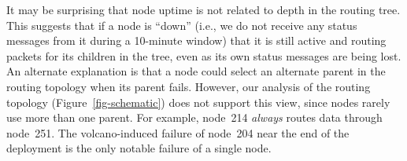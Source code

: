 It may be surprising that node uptime is not related to depth in the
routing tree. This suggests that if a node is ``down'' (i.e., we do
not receive any status messages from it during a 10-minute window)
that it is still active and routing packets for its children in the
tree, even as its own status messages are being lost. An alternate
explanation is that a node could select an alternate parent in the
routing topology when its parent fails. However, our analysis of the
routing topology (Figure~\ref{fig-schematic}) does not support this
view, since nodes rarely use more than one parent. For example,
node~214 {\em always} routes data through node~251. The
volcano-induced failure of node~204 near the end of the deployment
is the only notable failure of a single node.

